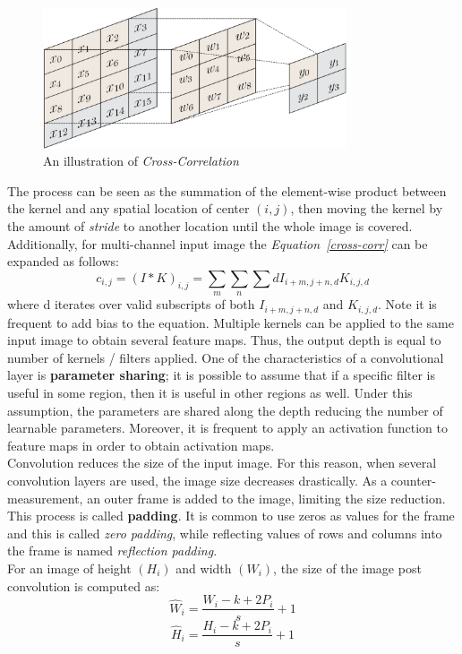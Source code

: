 \documentclass[12pt]{extarticle}
\begin{document}
	\begin{figure}[h]
		\centering
		\includegraphics[width=0.8\textwidth]{pics/Figures/convolution.png}
		\caption{\small{An illustration of \emph{Cross-Correlation}}}
		\label{fig:cross-corr}
	\end{figure}
	The process can be seen as the summation of the element-wise product between the kernel and any spatial location of center $(i, j)$, then moving the kernel by the amount of \emph{stride }to another location until the whole image is covered. Additionally, for multi-channel input image the \emph{Equation~\ref{cross-corr}} can be expanded as follows:
	\begin{equation}
		c_{i,j} = (I*K)_{i,j} = \sum_{m}\sum_{n}\sum{d}I_{i+m,j+n,d}K_{i,j,d}
	\end{equation}
	where d iterates over valid subscripts of both $I_{i+m,j+n,d}$ and $K_{i,j,d}$. Note it is frequent to add bias to the equation. Multiple kernels can be applied to the same input image to obtain several feature maps. Thus, the output depth is equal to number of kernels / filters applied. One of the characteristics of a convolutional layer is \textbf{parameter sharing}; it is possible to assume that if a specific filter is useful in some region, then it is useful in other regions as well. Under this assumption, the parameters are shared along the depth \cite{par_share} reducing the number of learnable parameters. Moreover, it is frequent to apply an activation function to feature maps in order to obtain activation maps.
	\\[5mm]
	Convolution reduces the size of the input image. For this reason, when several convolution layers are used, the image size decreases drastically. As a counter-measurement, an outer frame is added to the image, limiting the size reduction. This process is called \textbf{padding}. It is common to use zeros as values for the frame and this is called \emph{zero padding}, while reflecting values of rows and columns into the frame is named \emph{reflection padding}.\\[5mm]
	For an image of height $(H_i)$ and width $(W_i)$, the size of the image post convolution is computed as:
	\begin{equation}\label{width}
		\hat{W}_i = \dfrac{W_i-k+2P_i}{s}+1
	\end{equation}
	\begin{equation}\label{height}
		\hat{H}_i = \dfrac{H_i-k+2P_i}{s}+1
	\end{equation}
\end{document}
